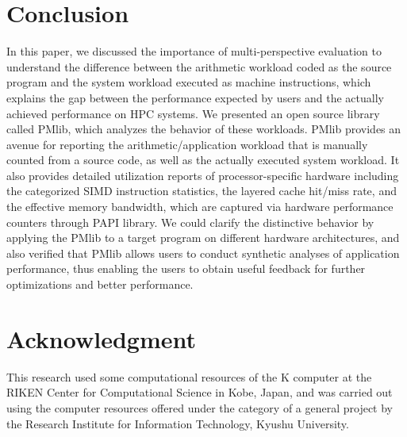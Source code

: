 \documentclass[conference]{IEEEtran}
\begin{document}
\section{Conclusion}
In this paper, we discussed the importance of multi-perspective evaluation
to understand the difference between the arithmetic workload coded as
the source program and the system workload executed as machine instructions,
which explains the gap between the performance
expected by users and the actually achieved performance on HPC systems.
We presented an open source library called PMlib, which analyzes the behavior
of these workloads.
PMlib provides an avenue for reporting the arithmetic/application workload
that is manually counted from a source code, as well as the actually executed
system workload.
It also provides detailed utilization reports of processor-specific hardware
including the categorized SIMD instruction statistics, the layered cache
hit/miss rate, and the effective memory bandwidth,
which are captured via hardware performance counters through PAPI library.
We could clarify the distinctive behavior by applying the PMlib to a target
program on different hardware architectures, and also verified that PMlib
allows users to conduct synthetic analyses of application performance,
thus enabling the users to obtain useful feedback for further optimizations
and better performance.

\section*{Acknowledgment}
This research used some computational resources of the K computer at the RIKEN Center for Computational Science in Kobe, Japan, and was carried out using the computer resources offered under the category of a general project by the Research Institute for Information Technology, Kyushu University.


\end{document}
